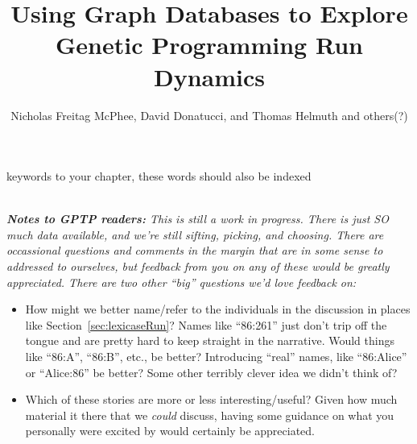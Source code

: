 %


\title*{Using Graph Databases to Explore Genetic Programming Run Dynamics}
\author{Nicholas Freitag McPhee, David Donatucci, and Thomas Helmuth and others(?)}

\maketitle


\begin{keywords}
keywords to your chapter, these words should also be indexed
\end{keywords}
\\

\emph{\textbf{Notes to GPTP readers:} This is still a work in progress. There is just SO much
	data available, and we're still sifting, picking, and choosing. There are occassional questions 
	and comments in the margin that are in some sense to addressed to ourselves, but feedback from
	you on any of these would be greatly appreciated. There are two other ``big'' questions we'd
	love feedback on:}
\begin{itemize}
	\item How might we better name/refer to the individuals in the discussion in places like
	Section~\ref{sec:lexicaseRun}? Names like ``86:261'' just don't trip off the tongue and are
	pretty hard to keep straight in the narrative. Would things like ``86:A'', ``86:B'', etc., be
	better? Introducing ``real'' names, like ``86:Alice'' or ``Alice:86'' be better? Some other
	terribly clever idea we didn't think of?
	\item Which of these stories are more or less interesting/useful? Given how much material
	it there that we \emph{could} discuss, having some guidance on what you personally were
	excited by would certainly be appreciated.
\end{itemize}

